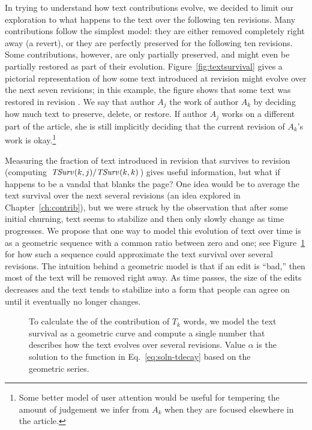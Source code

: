 In trying to understand how text contributions evolve, we decided
to limit our exploration to what happens to the text over the
following ten revisions.
Many contributions follow the simplest model: they are either
removed completely right away (a revert), or they are perfectly
preserved for the following ten revisions.
Some contributions, however, are only partially preserved, and
might even be partially restored as part of their evolution.
Figure~\ref{fig:textsurvival} gives a pictorial representation
of how some text introduced at revision  might
evolve over the next seven revisions; in this example, the
figure shows that some text was restored in revision .
We say that author $A_j$  the work of author
$A_k$ by deciding how much text to preserve, delete, or restore.
If author $A_j$ works on a different part of the article, she
is still implicitly deciding that the current revision of
$A_k$'s work is okay.\footnote{Some better model of
user attention would be useful for tempering the amount
of judgement we infer from
$A_k$ when they are focused elsewhere in the article.}

Measuring the fraction of text introduced in
revision  that survives to revision 
(\ie computing $\mathit{TSurv}_{}(k,j) / \mathit{TSurv}_{}(k,k)$)
gives useful information, but what if  happens to be
a vandal that blanks the page?
One idea would be to average the text survival over the next
several revisions (an idea explored in Chapter~\ref{ch:contrib}),
but we were struck by the observation that after some initial
churning, text seems to stabilize and then only slowly change
as time progresses.
We propose that one way to model this evolution of text over time
is as a geometric sequence with a common ratio between zero and one;
see Figure~\ref{fig:textlongevity} for how such a sequence could
approximate the text survival over several revisions.
The intuition behind a geometric model is that if an edit is
``bad,'' then most of the text will be removed right away.
As time passes, the size of the edits decreases and
the text tends to stabilize into a form
that people can agree on until it eventually no longer changes.


\begin{figure}[tbph]
\centering
{}
\caption{
    To calculate the  of the contribution
    of $T_k$ words, we model the text survival as a geometric curve
    and compute a single number that describes how the text evolves
    over several revisions.
    Value $\alpha$ is the solution to the function in
    Eq.~\ref{eq:soln-tdecay} based on the geometric series.
    }
\label{fig:textlongevity}
\end{figure}

